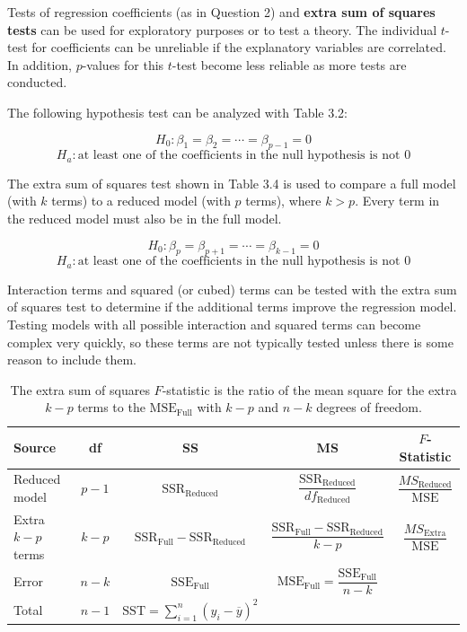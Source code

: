 \documentclass[
]{book}
\begin{document}
Tests of regression coefficients (as in Question 2) and \textbf{extra sum of squares tests} can be used for exploratory purposes or to test a theory. The individual \(t\)-test for coefficients can be unreliable if the explanatory variables are correlated. In addition, \(p\)-values for this \(t\)-test become less reliable as more tests are conducted.

The following hypothesis test can be analyzed with Table 3.2:

\[
H_0\!: \beta_1 = \beta_2 = \cdots = \beta_{p-1} = 0
\]
\[
H_a\!: \text{at least one of the coefficients in the null hypothesis is not 0}
\]

The extra sum of squares test shown in Table 3.4 is used to compare a full model (with \(k\) terms) to a reduced model (with \(p\) terms), where \(k > p\). Every term in the reduced model must also be in the full model.

\[
H_0\!: \beta_p = \beta_{p+1} = \cdots = \beta_{k-1} = 0
\]
\[
H_a\!: \text{at least one of the coefficients in the null hypothesis is not 0}
\]

Interaction terms and squared (or cubed) terms can be tested with the extra sum of squares test to determine if the additional terms improve the regression model. Testing models with all possible interaction and squared terms can become complex very quickly, so these terms are not typically tested unless there is some reason to include them.

\begin{table}[!h]
\centering
\caption{\label{tab:tab34}The extra sum of squares $F$-statistic is the ratio of the mean square for the extra $k-p$ terms to the $\text{MSE}_{\text{Full}}$ with $k-p$ and $n-k$ degrees of freedom.}
\centering
\begin{tabular}[t]{lcccc}
\toprule
Source & df & SS & MS & $F$-Statistic\\
\midrule
Reduced model & $p - 1$ & $\text{SSR}_{\text{Reduced}}$ & $\dfrac{\text{SSR}_{\text{Reduced}}}{df_{\text{Reduced}}}$ & $\dfrac{MS_{\text{Reduced}}}{\text{MSE}}$\\
Extra $k - p$ terms & $k - p$ & $\text{SSR}_{\text{Full}} - \text{SSR}_{\text{Reduced}}$ & $\dfrac{\text{SSR}_{\text{Full}} - \text{SSR}_{\text{Reduced}}}{k-p}$ & $\dfrac{MS_{\text{Extra}}}{\text{MSE}}$\\
Error & $n - k$ & $\text{SSE}_{\text{Full}}$ & $\text{MSE}_{\text{Full}} = \dfrac{\text{SSE}_{\text{Full}}}{n - k}$ & \\
Total & $n - 1$ & $\text{SST} = \sum_{i=1}^n (y_i - \overline{y})^2$ &  & \\
\bottomrule
\end{tabular}
\end{table}
\end{document}
